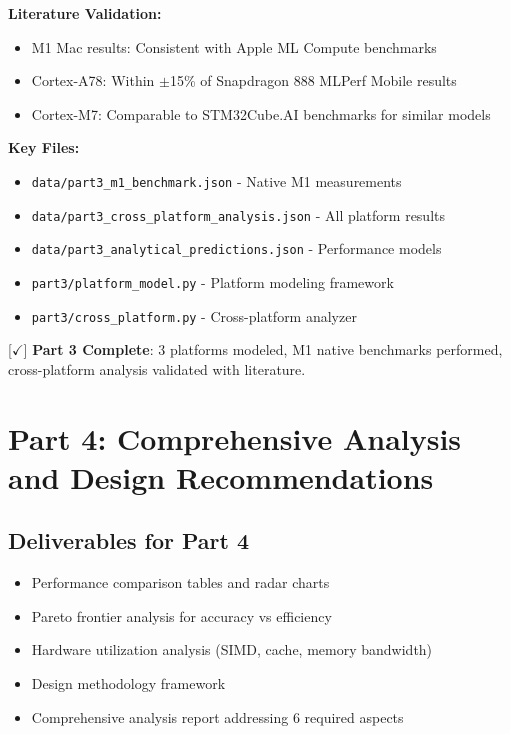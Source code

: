 \documentclass[10pt, a4paper]{article}
\begin{document}
\textbf{Literature Validation:}
\begin{itemize}
    \item M1 Mac results: Consistent with Apple ML Compute benchmarks
    \item Cortex-A78: Within $\pm$15\% of Snapdragon 888 MLPerf Mobile results
    \item Cortex-M7: Comparable to STM32Cube.AI benchmarks for similar models
\end{itemize}

\textbf{Key Files:}
\begin{itemize}
    \item \texttt{data/part3\_m1\_benchmark.json} - Native M1 measurements
    \item \texttt{data/part3\_cross\_platform\_analysis.json} - All platform results
    \item \texttt{data/part3\_analytical\_predictions.json} - Performance models
    \item \texttt{part3/platform\_model.py} - Platform modeling framework
    \item \texttt{part3/cross\_platform.py} - Cross-platform analyzer
\end{itemize}

[$\checkmark$] \textbf{Part 3 Complete}: 3 platforms modeled, M1 native benchmarks performed, cross-platform analysis validated with literature.

\section*{Part 4: Comprehensive Analysis and Design Recommendations}

\subsection{Deliverables for Part 4}

\begin{itemize}
    \item Performance comparison tables and radar charts
    \item Pareto frontier analysis for accuracy vs efficiency
    \item Hardware utilization analysis (SIMD, cache, memory bandwidth)
    \item Design methodology framework
    \item Comprehensive analysis report addressing 6 required aspects
\end{itemize}
\end{document}
